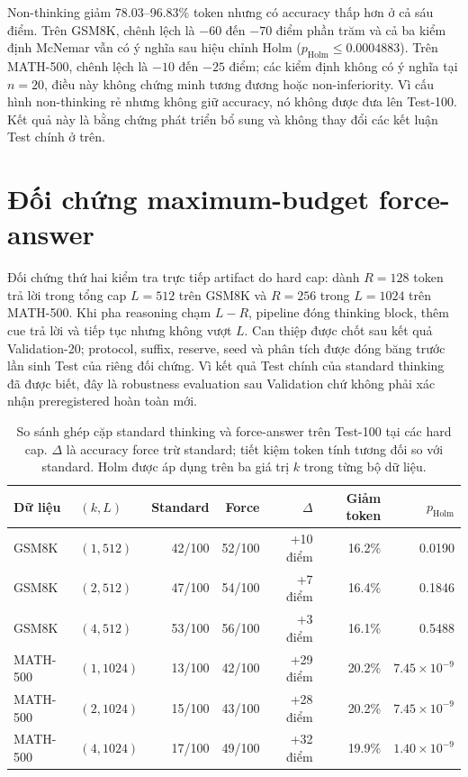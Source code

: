 Non-thinking giảm 78.03--96.83\% token nhưng có accuracy thấp hơn ở cả sáu
điểm. Trên GSM8K, chênh lệch là $-60$ đến $-70$ điểm phần trăm và cả ba kiểm
định McNemar vẫn có ý nghĩa sau hiệu chỉnh Holm
($p_{\mathrm{Holm}}\leq0.0004883$). Trên MATH-500, chênh lệch là $-10$ đến
$-25$ điểm; các kiểm định không có ý nghĩa tại $n=20$, điều này không chứng
minh tương đương hoặc non-inferiority. Vì cấu hình non-thinking rẻ nhưng không
giữ accuracy, nó không được đưa lên Test-100. Kết quả này là bằng chứng phát
triển bổ sung và không thay đổi các kết luận Test chính ở trên.

\section{Đối chứng maximum-budget force-answer}

Đối chứng thứ hai kiểm tra trực tiếp artifact do hard cap: dành $R=128$ token
trả lời trong tổng cap $L=512$ trên GSM8K và $R=256$ trong $L=1024$ trên
MATH-500. Khi pha reasoning chạm $L-R$, pipeline đóng thinking block, thêm cue
trả lời và tiếp tục nhưng không vượt $L$. Can thiệp được chốt sau kết quả
Validation-20; protocol, suffix, reserve, seed và phân tích được đóng băng trước
lần sinh Test của riêng đối chứng. Vì kết quả Test chính của standard thinking
đã được biết, đây là robustness evaluation sau Validation chứ không phải xác
nhận preregistered hoàn toàn mới.

\begin{table}[htbp]
  \centering
  \caption{So sánh ghép cặp standard thinking và force-answer trên Test-100 tại
  các hard cap. $\Delta$ là accuracy force trừ standard; tiết kiệm token tính
  tương đối so với standard. Holm được áp dụng trên ba giá trị $k$ trong từng
  bộ dữ liệu.}
  \label{tab:force-answer-test}
  \scriptsize
  \begin{tabular}{llrrrrr}
    \toprule
    Dữ liệu & $(k,L)$ & Standard & Force & $\Delta$ & Giảm token & $p_{\mathrm{Holm}}$ \\
    \midrule
    GSM8K & $(1,512)$ & 42/100 & 52/100 & +10 điểm & 16.2\% & 0.0190 \\
    GSM8K & $(2,512)$ & 47/100 & 54/100 & +7 điểm & 16.4\% & 0.1846 \\
    GSM8K & $(4,512)$ & 53/100 & 56/100 & +3 điểm & 16.1\% & 0.5488 \\
    MATH-500 & $(1,1024)$ & 13/100 & 42/100 & +29 điểm & 20.2\% & $7.45\times10^{-9}$ \\
    MATH-500 & $(2,1024)$ & 15/100 & 43/100 & +28 điểm & 20.2\% & $7.45\times10^{-9}$ \\
    MATH-500 & $(4,1024)$ & 17/100 & 49/100 & +32 điểm & 19.9\% & $1.40\times10^{-9}$ \\
    \bottomrule
  \end{tabular}
\end{table}

